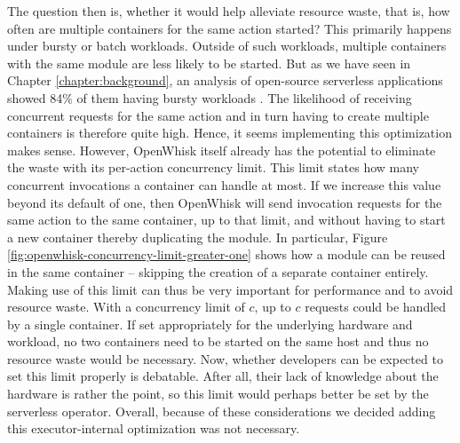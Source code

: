 The question then is, whether it would help alleviate resource waste, that is, how often are multiple containers for the same action started?
This primarily happens under bursty or batch workloads. Outside of such workloads, multiple containers with the same module are less likely to be started. But as we have seen in Chapter \ref{chapter:background}, an analysis of open-source serverless applications showed 84\% of them having bursty workloads \cite{Eismann2021}. The likelihood of receiving concurrent requests for the same action and in turn having to create multiple containers is therefore quite high. Hence, it seems implementing this optimization makes sense.
However, OpenWhisk itself already has the potential to eliminate the waste with its per-action concurrency limit. This limit states how many concurrent invocations a container can handle at most. If we increase this value beyond its default of one, then OpenWhisk will send invocation requests for the same action to the same container, up to that limit, and without having to start a new container thereby duplicating the module. In particular, Figure \ref{fig:openwhisk-concurrency-limit-greater-one} shows how a module can be reused in the same container -- skipping the creation of a separate container entirely. Making use of this limit can thus be very important for performance and to avoid resource waste. With a concurrency limit of $c$, up to $c$ requests could be handled by a single container. If set appropriately for the underlying hardware and workload, no two containers need to be started on the same host and thus no resource waste would be necessary. Now, whether developers can be expected to set this limit properly is debatable. After all, their lack of knowledge about the hardware is rather the point, so this limit would perhaps better be set by the serverless operator.
Overall, because of these considerations we decided adding this executor-internal optimization was not necessary.
